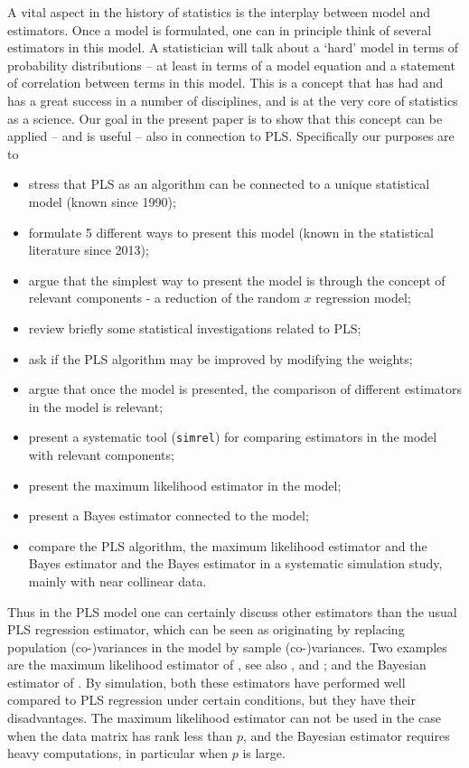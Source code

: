 \documentclass[num-refs]{wiley-article}
\begin{document}
 A vital aspect in the history of statistics is the interplay between model and estimators. Once a model is formulated, one can in principle think of several estimators in this model. A statistician will talk about a `hard' model in terms of probability distributions -- at least in terms of a model equation and a statement of correlation between terms in this model. This is a concept that has had and has a great success in a number of disciplines, and is at the very core of statistics as a science. Our goal in the present paper is to show that this concept can be applied -- and is useful -- also in connection to PLS. Specifically our purposes are to

\begin{itemize}[label={--}]
\item stress that PLS as an algorithm can be connected to a unique statistical model (known since 1990);
\item formulate 5 different ways to present this model (known in the statistical literature since 2013);
\item argue that the simplest way to present the model is through the concept of relevant components - a reduction of the random $x$ regression model;
\item review briefly some statistical investigations related to PLS;
\item ask if the PLS algorithm may be improved by modifying the weights;
\item argue that once the model is presented, the comparison of different estimators in the model is relevant;
\item present a systematic tool ({\tt simrel}) for comparing estimators in the model with relevant components;
\item present the maximum likelihood estimator in the model;
\item present a Bayes estimator connected to the model;
\item compare the PLS algorithm, the maximum likelihood estimator and the Bayes estimator and the Bayes estimator in a systematic simulation study, mainly with near collinear data.
\end{itemize}


Thus in the PLS model one can certainly discuss other estimators than the usual PLS regression estimator, which can be seen as originating by replacing population (co-)variances in the model by sample (co-)variances. Two examples are the maximum likelihood estimator of \citet{cook2013envelopes}, see also \citep{cook2015envlp}, \citep{cook2016note} and \citep{cook2016algorithms}; and the Bayesian estimator of \citet{helland2012near}. By simulation, both these estimators have performed well compared to PLS regression under certain conditions, but they have their disadvantages. The maximum likelihood estimator can not be used in the case when the data matrix has rank less than $p$, and the Bayesian estimator requires heavy computations, in particular when $p$ is large.
\end{document}
